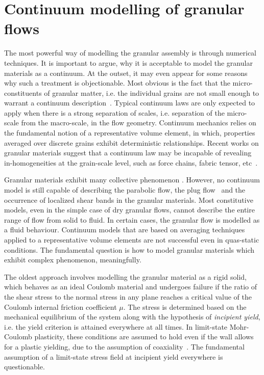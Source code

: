 \section{Continuum modelling of granular flows}

The most powerful way of modelling the granular assembly is through numerical 
techniques. It is important to argue, why it is acceptable to model the 
granular materials as a continuum. At the outset, it may even appear for some 
reasons why such a treatment is objectionable. Most obvious is the fact that 
the micro-constituents of granular matter, i.e. the individual grains are not 
small enough to warrant a continuum description~\citep{Kamrin2007}. Typical 
continuum laws are only expected to apply when there is a strong separation of 
scales, i.e. separation of the micro-scale from the macro-scale, in the flow 
geometry. Continuum mechanics relies on the fundamental notion of a 
representative volume element, in which, properties averaged over discrete 
grains exhibit deterministic relationships. Recent works on granular 
materials suggest that a continuum law may be incapable of revealing 
in-homogeneities at the grain-scale level, such as force 
chains, fabric tensor, etc~\citep{Rycroft2009}. 

Granular materials exhibit many collective phenomenon \citep{Jaeger1996}. 
However, no continuum model is still capable of describing the parabolic flow, 
the plug flow~\citep{Rycroft2006} and the occurrence of localized shear bands 
in the granular materials. Most constitutive models, even in the simple case of 
dry granular flows, cannot describe the entire range of flow from solid to 
fluid. In certain cases, the granular flow is modelled as a fluid behaviour. 
Continuum models that are based on averaging techniques applied to a 
representative volume elements are not successful even in quas-static 
conditions. The fundamental question is how to model granular materials which 
exhibit complex phenomenon, meaningfully. 

The oldest approach involves modelling the granular material as a rigid solid, 
which behaves as an ideal Coulomb material and undergoes failure if the ratio 
of the shear stress to the normal stress in any plane reaches a critical value 
of the Coulomb internal friction coefficient $\mu$. The stress is determined 
based on the mechanical equilibrium of the system along with the hypothesis of 
\textit{incipient yield}, i.e. the yield criterion is attained everywhere at 
all times. In limit-state Mohr-Coulomb plasticity, these conditions are assumed 
to hold even if the wall allows for a plastic yielding, due to the assumption 
of coaxiality~\citep{Rycroft2009}. The fundamental assumption of a limit-state 
stress field at incipient yield everywhere is questionable.

